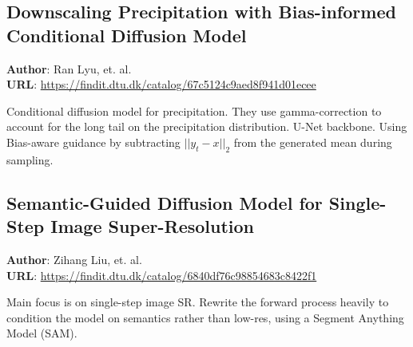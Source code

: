 \subsection*{Downscaling Precipitation with Bias-informed Conditional Diffusion Model} \label{bgs-paper}
\textbf{Author}: Ran Lyu, et. al. \\
\textbf{URL}: \hyperlink{findit}{https://findit.dtu.dk/catalog/67c5124c9aed8f941d01ecee}

Conditional diffusion model for precipitation. They use gamma-correction to account for the long tail on the precipitation distribution. U-Net backbone. Using Bias-aware guidance by subtracting $||y_t-x||_2$ from the generated mean during sampling.

\subsection*{Semantic-Guided Diffusion Model for Single-Step Image Super-Resolution}
\textbf{Author}: Zihang Liu, et. al. \\
\textbf{URL}: \hyperlink{findit}{https://findit.dtu.dk/catalog/6840df76c98854683c8422f1}

Main focus is on single-step image SR. Rewrite the forward process heavily to condition the model on semantics rather than low-res, using a Segment Anything Model (SAM). 